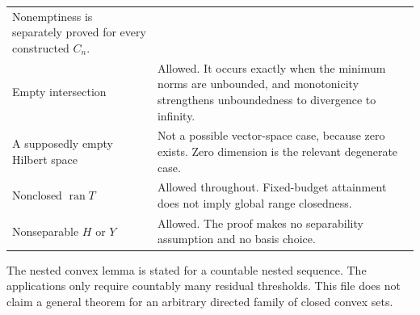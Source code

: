 \documentclass[11pt]{article}
\begin{document}
\begin{longtable}[]{@{}
  >{\raggedright\arraybackslash}p{}
  >{\raggedright\arraybackslash}p{}@{}}
Nonemptiness is separately proved for every constructed \(C_n\). \\
Empty intersection & Allowed. It occurs exactly when the minimum norms
are unbounded, and monotonicity strengthens unboundedness to divergence
to infinity. \\
A supposedly empty Hilbert space & Not a possible vector-space case,
because zero exists. Zero dimension is the relevant degenerate case. \\
Nonclosed \(\operatorname{ran} T\) & Allowed throughout. Fixed-budget
attainment does not imply global range closedness. \\
Nonseparable \(H\) or \(Y\) & Allowed. The proof makes no separability
assumption and no basis choice. \\
\end{longtable}

The nested convex lemma is stated for a countable nested sequence. The
applications only require countably many residual thresholds. This file
does not claim a general theorem for an arbitrary directed family of
closed convex sets.
\end{document}

